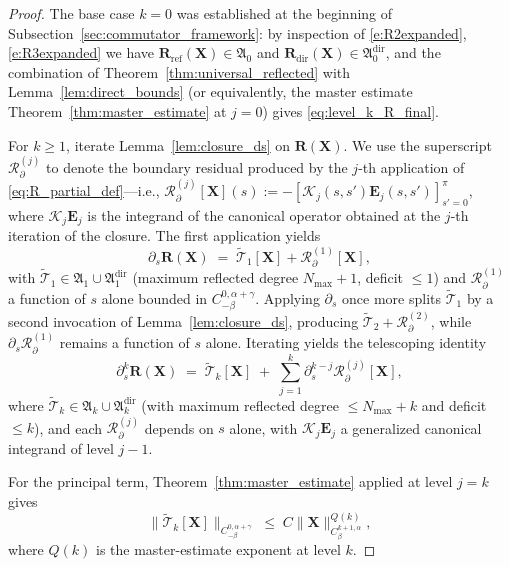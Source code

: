\documentclass{amsart}
\begin{document}
\begin{proof}
The base case $k = 0$ was established at the beginning of Subsection~\ref{sec:commutator_framework}: by inspection of \eqref{e:R2expanded}, \eqref{e:R3expanded} we have $\mathbf{R}_{\mathrm{ref}}(\mathbf{X}) \in \mathfrak{A}_0$ and $\mathbf{R}_{\mathrm{dir}}(\mathbf{X}) \in \mathfrak{A}_0^{\mathrm{dir}}$, and the combination of Theorem~\ref{thm:universal_reflected} with Lemma~\ref{lem:direct_bounds} (or equivalently, the master estimate Theorem~\ref{thm:master_estimate} at $j = 0$) gives \eqref{eq:level_k_R_final}.

For $k \ge 1$, iterate Lemma~\ref{lem:closure_ds} on $\mathbf{R}(\mathbf{X})$. We use the superscript $\mathcal{R}_\partial^{(j)}$ to denote the boundary residual produced by the $j$-th application of \eqref{eq:R_partial_def}---i.e., $\mathcal{R}_\partial^{(j)}[\mathbf{X}](s) := -[\mathcal{K}_j(s,s')\mathbf{E}_j(s,s')]_{s'=0}^\pi$, where $\mathcal K_j \mathbf E_j$ is the integrand of the canonical operator obtained at the $j$-th iteration of the closure. The first application yields
\[
\partial_s\mathbf{R}(\mathbf{X})
\;=\; \widetilde{\mathcal{T}}_1[\mathbf{X}] + \mathcal{R}_\partial^{(1)}[\mathbf{X}],
\]
with $\widetilde{\mathcal{T}}_1 \in \mathfrak{A}_1 \cup \mathfrak{A}_1^{\mathrm{dir}}$ (maximum reflected degree $N_{\max}+1$, deficit $\le 1$) and $\mathcal{R}_\partial^{(1)}$ a function of $s$ alone bounded in $C^{0,\alpha+\gamma}_{-\beta}$.  Applying $\partial_s$ once more splits $\widetilde{\mathcal{T}}_1$ by a second invocation of Lemma~\ref{lem:closure_ds}, producing $\widetilde{\mathcal{T}}_2 + \mathcal{R}_\partial^{(2)}$, while $\partial_s\mathcal{R}_\partial^{(1)}$ remains a function of $s$ alone.  Iterating yields the telescoping identity
\begin{equation}\label{eq:partial_s_k_R}
\partial_s^k \mathbf{R}(\mathbf{X})
 \;=\; \widetilde{\mathcal{T}}_k[\mathbf{X}]
 \;+\; \sum_{j=1}^{k} \partial_s^{k-j}\mathcal{R}_\partial^{(j)}[\mathbf{X}],
\end{equation}
where $\widetilde{\mathcal{T}}_k \in \mathfrak{A}_k \cup \mathfrak{A}_k^{\mathrm{dir}}$ (with maximum reflected degree $\le N_{\max}+k$ and deficit $\le k$), and each $\mathcal{R}_\partial^{(j)}$ depends on $s$ alone, with $\mathcal{K}_j\mathbf{E}_j$ a generalized canonical integrand of level $j-1$.

For the principal term, Theorem~\ref{thm:master_estimate} applied at level $j = k$ gives
\[
\bigl\|\widetilde{\mathcal{T}}_k[\mathbf{X}]\bigr\|_{C^{0,\alpha+\gamma}_{-\beta}}
 \;\le\; C\|\mathbf{X}\|_{C^{k+1,\alpha}_\beta}^{Q(k)},
\]
where $Q(k)$ is the master-estimate exponent at level $k$.


\end{proof}
\end{document}
